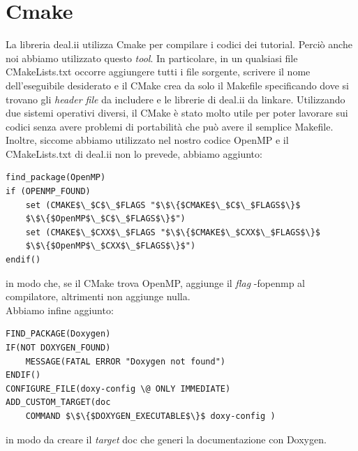 \documentclass[a4paper,10pt]{report}
\theoremstyle{plain}
\theoremstyle{definition}
\theoremstyle{remark}
\begin{document}
\section{\textsf{Cmake}}
La libreria \textsf{deal.ii} utilizza \textsf{Cmake} per compilare i codici dei tutorial. Perci\`o anche noi abbiamo utilizzato questo \emph{tool}. In particolare, in un qualsiasi file \textsf{CMakeLists.txt} occorre aggiungere tutti i file sorgente, scrivere il nome dell'eseguibile desiderato e il \textsf{CMake} crea da solo il \textsf{Makefile} specificando dove si trovano gli \emph{header file} da includere e le librerie di \textsf{deal.ii} da linkare. Utilizzando due sistemi operativi diversi, il \textsf{CMake} \`e stato molto utile per poter lavorare sui codici senza avere problemi di portabilit\`a che pu\`o avere il semplice \textsf{Makefile}. Inoltre, siccome abbiamo utilizzato nel nostro codice \textsf{OpenMP} e il \textsf{CMakeLists.txt} di \textsf{deal.ii} non lo prevede, abbiamo aggiunto:
\begin{lstlisting}
find_package(OpenMP)
if (OPENMP_FOUND)
    set (CMAKE$\_$C$\_$FLAGS "$\$\{$CMAKE$\_$C$\_$FLAGS$\}$
	$\$\{$OpenMP$\_$C$\_$FLAGS$\}$")
    set (CMAKE$\_$CXX$\_$FLAGS "$\$\{$CMAKE$\_$CXX$\_$FLAGS$\}$
	$\$\{$OpenMP$\_$CXX$\_$FLAGS$\}$")
endif()
\end{lstlisting}
in modo che, se il \textsf{CMake} trova \textsf{OpenMP}, aggiunge il \emph{flag} \textsf{-fopenmp} al compilatore, altrimenti non aggiunge nulla.\\Abbiamo infine aggiunto:
\begin{lstlisting}
FIND_PACKAGE(Doxygen)
IF(NOT DOXYGEN_FOUND)
	MESSAGE(FATAL ERROR "Doxygen not found")
ENDIF()
CONFIGURE_FILE(doxy-config \@ ONLY IMMEDIATE)
ADD_CUSTOM_TARGET(doc
	COMMAND $\$\{$DOXYGEN_EXECUTABLE$\}$ doxy-config )
\end{lstlisting}
in modo da creare il \emph{target} \textsf{doc} che generi la documentazione con \textsf{Doxygen}.
\end{document}
